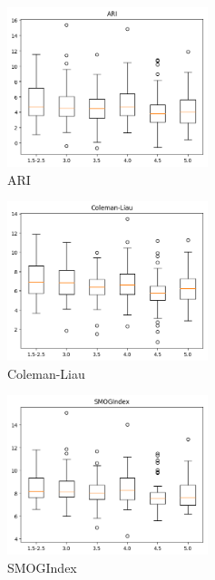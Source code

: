 \documentclass[12pt,journal,compsoc]{IEEEtran}
\begin{document}
\begin{minipage}{\linewidth}
  \centering
  \begin{minipage}{0.25\linewidth}
      \begin{figure}[H]
          \includegraphics[width=2.3in]{../unigrams/scripts/boxplots/not-normalized-ARI.png}
          \caption{ARI}
      \end{figure}
  \end{minipage}
  \hspace{0.05\linewidth}
  \begin{minipage}{0.25\linewidth}
      \begin{figure}[H]
          \includegraphics[width=2.3in]{../unigrams/scripts/boxplots/not-normalized-Coleman-Liau.png}
          \caption{Coleman-Liau}
      \end{figure}
  \end{minipage}
  \hspace{0.05\linewidth}
  \begin{minipage}{0.25\linewidth}
      \begin{figure}[H]
          \includegraphics[width=2.3in]{../unigrams/scripts/boxplots/not-normalized-SMOGIndex.png}
          \caption{SMOGIndex}
      \end{figure}
  \end{minipage}
\end{minipage}
\end{document}

